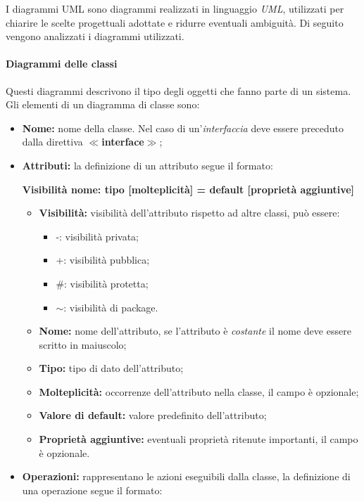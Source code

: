 \label{DiagrammiUML}I diagrammi UML sono diagrammi realizzati in linguaggio \textit{UML}, utilizzati per chiarire le scelte progettuali adottate e ridurre eventuali ambiguità. 
Di seguito vengono analizzati i diagrammi utilizzati.
\paragraph*{Diagrammi delle classi}
Questi diagrammi descrivono il tipo degli oggetti che fanno parte di un sistema.\\
Gli elementi di un diagramma di classe sono:
\begin{itemize}
	\item \textbf{Nome:} nome della classe. Nel caso di un'\textit{interfaccia} deve essere preceduto dalla direttiva \textbf{$\ll$interface$\gg$};
	\item \textbf{Attributi:} la definizione di un attributo segue il formato:
	\begin{center}
		\textbf{Visibilità nome: tipo [molteplicità] = default [proprietà aggiuntive]}
	\end{center}
	\begin{itemize}
		\item \textbf{Visibilità:} visibilità dell'attributo rispetto ad altre classi, può essere:
		\begin{itemize}
			\item -: visibilità privata;
			\item +: visibilità pubblica;
			\item \#: visibilità protetta;
			\item $\sim$: visibilità di package.
		\end{itemize}
		\item \textbf{Nome:} nome dell'attributo, se l'attributo è \textit{costante} il nome deve essere scritto in maiuscolo;
		\item \textbf{Tipo:} tipo di dato dell'attributo;
		\item \textbf{Molteplicità:} occorrenze dell'attributo nella classe, il campo è opzionale;
		\item \textbf{Valore di default:} valore predefinito dell'attributo;
		\item \textbf{Proprietà aggiuntive:} eventuali proprietà ritenute importanti, il campo è opzionale.
	\end{itemize}
	\item \textbf{Operazioni:} rappresentano le azioni eseguibili dalla classe, la definizione di una operazione segue il formato:

\end{itemize}
